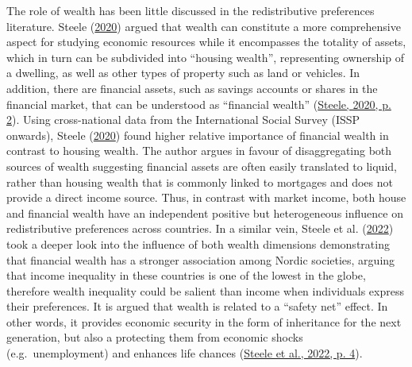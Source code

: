 \documentclass[
  12pt,
]{book}
\begin{document}
The role of wealth has been little discussed in the redistributive preferences literature. Steele (\protect\hyperlink{ref-steele_wealth_2020}{2020}) argued that wealth can constitute a more comprehensive aspect for studying economic resources while it encompasses the totality of assets, which in turn can be subdivided into ``housing wealth'', representing ownership of a dwelling, as well as other types of property such as land or vehicles. In addition, there are financial assets, such as savings accounts or shares in the financial market, that can be understood as ``financial wealth'' (\protect\hyperlink{ref-steele_wealth_2020}{Steele, 2020, p. 2}). Using cross-national data from the International Social Survey (ISSP onwards), Steele (\protect\hyperlink{ref-steele_wealth_2020}{2020}) found higher relative importance of financial wealth in contrast to housing wealth. The author argues in favour of disaggregating both sources of wealth suggesting financial assets are often easily translated to liquid, rather than housing wealth that is commonly linked to mortgages and does not provide a direct income source. Thus, in contrast with market income, both house and financial wealth have an independent positive but heterogeneous influence on redistributive preferences across countries. In a similar vein, Steele et al. (\protect\hyperlink{ref-steele_wealth_2022}{2022}) took a deeper look into the influence of both wealth dimensions demonstrating that financial wealth has a stronger association among Nordic societies, arguing that income inequality in these countries is one of the lowest in the globe, therefore wealth inequality could be salient than income when individuals express their preferences. It is argued that wealth is related to a ``safety net'' effect. In other words, it provides economic security in the form of inheritance for the next generation, but also a protecting them from economic shocks (e.g.~unemployment) and enhances life chances (\protect\hyperlink{ref-steele_wealth_2022}{Steele et al., 2022, p. 4}).
\end{document}
